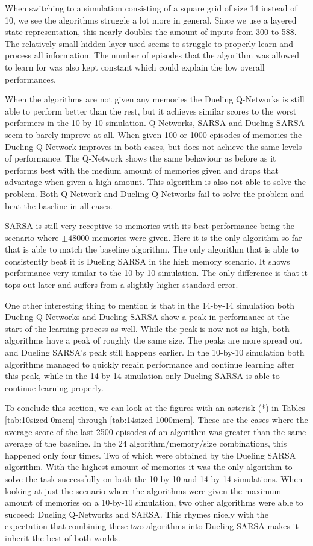 When switching to a simulation consisting of a square grid of size 14 instead of 10, we see the algorithms struggle a lot more in general. Since we use a layered state representation, this nearly doubles the amount of inputs from 300 to 588. The relatively small hidden layer used seems to struggle to properly learn and process all information. The number of episodes that the algorithm was allowed to learn for was also kept constant which could explain the low overall performances.

When the algorithms are not given any memories the Dueling Q-Networks is still able to perform better than the rest, but it achieves similar scores to the worst performers in the 10-by-10 simulation. Q-Networks, SARSA and Dueling SARSA seem to barely improve at all. When given 100 or 1000 episodes of memories the Dueling Q-Network improves in both cases, but does not achieve the same levels of performance. The Q-Network shows the same behaviour as before as it performs best with the medium amount of memories given and drops that advantage when given a high amount. This algorithm is also not able to solve the problem. Both Q-Network and Dueling Q-Networks fail to solve the problem and beat the baseline in all cases.

SARSA is still very receptive to memories with its best performance being the scenario where $\pm 48000$ memories were given. Here it is the only algorithm so far that is able to match the baseline algorithm. The only algorithm that is able to consistently beat it is Dueling SARSA in the high memory scenario. It shows performance very similar to the 10-by-10 simulation. The only difference is that it tops out later and suffers from a slightly higher standard error.

One other interesting thing to mention is that in the 14-by-14 simulation both Dueling Q-Networks and Dueling SARSA show a peak in performance at the start of the learning process as well. While the peak is now not as high, both algorithms have a peak of roughly the same size. The peaks are more spread out and Dueling SARSA's peak still happens earlier. In the 10-by-10 simulation both algorithms managed to quickly regain performance and continue learning after this peak, while in the 14-by-14 simulation only Dueling SARSA is able to continue learning properly.

To conclude this section, we can look at the figures with an asterisk (*) in Tables \ref{tab:10sized-0mem} through \ref{tab:14sized-1000mem}. These are the cases where the average score of the last 2500 episodes of an algorithm was greater than the same average of the baseline. In the 24 algorithm/memory/size combinations, this happened only four times. Two of which were obtained by the Dueling SARSA algorithm. With the highest amount of memories it was the only algorithm to solve the task successfully on both the 10-by-10 and 14-by-14 simulations. When looking at just the scenario where the algorithms were given the maximum amount of memories on a 10-by-10 simulation, two other algorithms were able to succeed: Dueling Q-Networks and SARSA. This rhymes nicely with the expectation that combining these two algorithms into Dueling SARSA makes it inherit the best of both worlds.